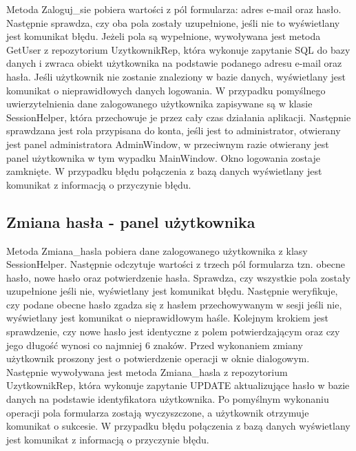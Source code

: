 Metoda Zaloguj\_sie pobiera wartości z pól formularza: adres e-mail oraz hasło. 
Następnie sprawdza, czy oba pola zostały uzupełnione, jeśli nie to wyświetlany jest komunikat błędu. Jeżeli pola są wypełnione, wywoływana 
jest metoda GetUser z repozytorium UzytkownikRep, która wykonuje zapytanie SQL do bazy danych i zwraca obiekt użytkownika 
na podstawie podanego adresu e-mail oraz hasła. Jeśli użytkownik nie zostanie znaleziony w bazie danych, wyświetlany jest komunikat o 
nieprawidłowych danych logowania. W przypadku pomyślnego uwierzytelnienia dane zalogowanego użytkownika zapisywane są w klasie
SessionHelper, która przechowuje je przez cały czas działania aplikacji. Następnie sprawdzana jest rola przypisana do konta, jeśli jest 
to administrator, otwierany jest panel administratora AdminWindow, w przeciwnym razie otwierany jest panel użytkownika w tym wypadku MainWindow. 
Okno logowania zostaje zamknięte. W przypadku błędu połączenia z bazą danych wyświetlany jest komunikat z informacją o przyczynie błędu.



\subsection{Zmiana hasła - panel użytkownika}

Metoda Zmiana\_hasla pobiera dane zalogowanego użytkownika z klasy SessionHelper. 
Następnie odczytuje wartości z trzech pól formularza tzn. obecne hasło, nowe hasło oraz potwierdzenie hasła. 
Sprawdza, czy wszystkie pola zostały uzupełnione jeśli nie, wyświetlany jest komunikat błędu. Następnie weryfikuje, 
czy podane obecne hasło zgadza się z hasłem przechowywanym w sesji jeśli nie, wyświetlany jest komunikat o nieprawidłowym haśle.
Kolejnym krokiem jest sprawdzenie, czy nowe hasło jest identyczne z polem potwierdzającym oraz czy jego długość wynosi co najmniej 6 znaków.
Przed wykonaniem zmiany użytkownik proszony jest o potwierdzenie operacji w oknie dialogowym. Następnie wywoływana jest metoda Zmiana\_hasla 
z repozytorium UzytkownikRep, która wykonuje 
zapytanie UPDATE aktualizujące hasło w bazie danych na podstawie identyfikatora użytkownika. Po pomyślnym wykonaniu operacji pola formularza zostają 
wyczyszczone, a użytkownik otrzymuje komunikat o sukcesie. W przypadku błędu połączenia z bazą danych wyświetlany 
jest komunikat z informacją o przyczynie błędu.

